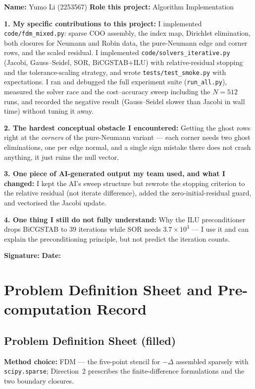 \documentclass[11pt,a4paper]{article}
\begin{document}
\begin{formbox}
\textbf{Name:} Yumo Li (2253567)
\textbf{Role this project:} Algorithm Implementation

\textbf{1. My specific contributions to this project:}
I implemented \texttt{code/fdm\_mixed.py}: sparse COO assembly, the index
map, Dirichlet elimination, both closures for Neumann and Robin data, the
pure-Neumann edge and corner rows, and the scaled residual.  I
implemented \texttt{code/solvers\_iterative.py} (Jacobi, Gauss--Seidel,
SOR, BiCGSTAB+ILU) with relative-residual stopping and the
tolerance-scaling strategy, and wrote \texttt{tests/test\_smoke.py} with
expectations.  I ran and debugged the full experiment suite
(\texttt{run\_all.py}), measured the solver race and the cost--accuracy
sweep including the $N = 512$ runs, and recorded the negative result
(Gauss--Seidel slower than Jacobi in wall time) without tuning it away.

\textbf{2. The hardest conceptual obstacle I encountered:}
Getting the ghost rows right at the \emph{corners} of the pure-Neumann
variant --- each corner needs two ghost eliminations, one per edge
normal, and a single sign mistake there does not crash anything, it just
ruins the null vector.

\textbf{3. One piece of AI-generated output my team used, and what I
changed:}
I kept the AI's sweep structure but rewrote the stopping criterion to
the relative residual (not iterate difference), added the
zero-initial-residual guard, and vectorised the Jacobi update.

\textbf{4. One thing I still do not fully understand:}
Why the ILU preconditioner drops BiCGSTAB to 39 iterations while SOR
needs $3.7\times10^3$ --- I use it and can explain the preconditioning
principle, but not predict the iteration counts.

\textbf{Signature:} \underline{\hspace{4cm}} \quad \textbf{Date:}
\underline{\hspace{2cm}}
\end{formbox}

\newpage
{}
\section{Problem Definition Sheet and Pre-computation Record}
\label{app:precomp}

\subsection*{Problem Definition Sheet (filled)}
\textbf{Method choice:} FDM --- the five-point stencil for $-\Delta$
assembled sparsely with \texttt{scipy.sparse}; Direction~2 prescribes the
finite-difference formulations and the two boundary closures.
\end{document}
